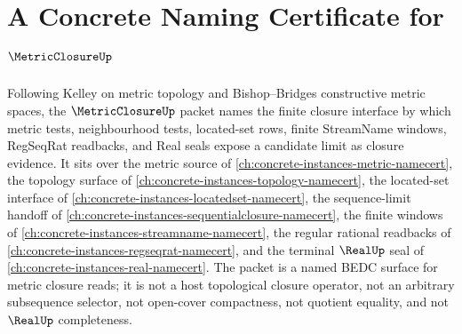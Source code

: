 \chapter{A Concrete Naming Certificate for $\MetricClosureUp$}
\label{ch:concrete-instances-metric-closure-namecert}

Following Kelley on metric topology and Bishop--Bridges constructive metric spaces, the $\MetricClosureUp$ packet names the finite closure interface by which metric tests, neighbourhood tests, located-set rows, finite StreamName windows, RegSeqRat readbacks, and Real seals expose a candidate limit as closure evidence. It sits over the metric source of \autoref{ch:concrete-instances-metric-namecert}, the topology surface of \autoref{ch:concrete-instances-topology-namecert}, the located-set interface of \autoref{ch:concrete-instances-locatedset-namecert}, the sequence-limit handoff of \autoref{ch:concrete-instances-sequentialclosure-namecert}, the finite windows of \autoref{ch:concrete-instances-streamname-namecert}, the regular rational readbacks of \autoref{ch:concrete-instances-regseqrat-namecert}, and the terminal $\RealUp$ seal of \autoref{ch:concrete-instances-real-namecert}. The packet is a named BEDC surface for metric closure reads; it is not a host topological closure operator, not an arbitrary subsequence selector, not open-cover compactness, not quotient equality, and not $\RealUp$ completeness.

